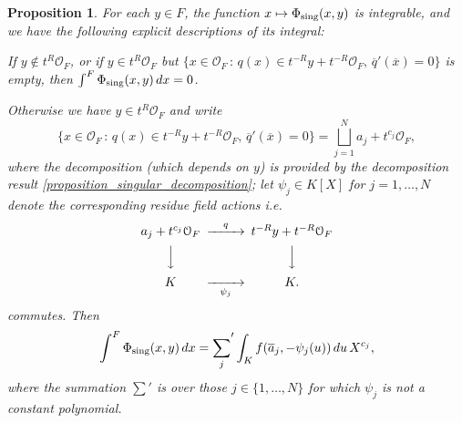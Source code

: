 \documentclass{lmsMODIFIED}
\newtheorem{proposition}[theorem]{Proposition}
\newcommand{\roi}{\mathcal{O}}
\newcommand{\res}[1]{\overline{#1}}
\newcommand{\sub}[1]{{\mbox{\scriptsize {#1}}}}
\begin{document}
\begin{proposition}\label{proposition_integral_of_singular_sections}
For each $y\in F$, the function $x\mapsto\Phi_\sub{sing}(x,y)$ is integrable, and we have the following explicit descriptions of its integral:

If $y\notin t^R\roi_{F}$, or if $y\in t^R\roi_{F}$ but $\{x\in\roi_{F}\,:\,q(x)\in t^{-R}y+t^{-R}\roi_{F},\,\res{q}'(\res{x})=0\}$ is empty, then $\int^F\Phi_\sub{sing}(x,y)\,dx=0$.

Otherwise we have $y\in t^R\roi_{F}$ and write \[\{x\in\roi_{F}\,:\,q(x)\in t^{-R}y+t^{-R}\roi_{F},\,\res{q}'(\res{x})=0\}=\bigsqcup_{j=1}^N a_j+t^{c_j}\roi_{F},\] where the decomposition (which depends on $y$) is provided by the decomposition result \ref{proposition_singular_decomposition}; let $\psi_j\in K[X]$ for $j=1,\dots,N$ denote the corresponding residue field actions i.e.
\[\begin{CD}
a_j+t^{c_j}\roi_{F} @>q>> t^{-R}y+t^{-R}\roi_{F} \\
@VVV  @VVV  \\
 K  @>>\psi_j>  K .\\
\end{CD}\]
commutes. Then \[\int^F\Phi_\sub{sing}(x,y)\,dx={\sum_j^{}}' \int_K f(\res{a}_j,-\psi_j(u))\,du\,X^{c_j},\] where the summation $\sum'$ is over those $j\in\{1,\dots,N\}$ for which $\psi_j$ is not a constant polynomial.
\end{proposition}
\end{document}
